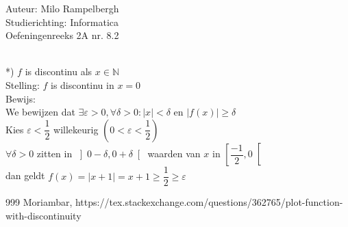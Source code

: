 \documentclass[a4paper]{article}
\newcommand{\E}{\varepsilon}
\begin{document}
\noindent \large Auteur: Milo Rampelbergh \\
\noindent \large Studierichting: Informatica\\
\noindent \large Oefeningenreeks 2A nr. 8.2\\

\medskip

\normalsize


 \\

*) $f$ is discontinu als $ x \in \mathbb{N} $ \\

Stelling: $f$ is discontinu in $ x = 0 $ \\

Bewijs: \\

We bewijzen dat $ \exists \E > 0, \forall \delta > 0: |x| < \delta $ en $ |f(x)| \geq \delta $ \\

Kies $ \E < \dfrac{1}{2} $ willekeurig $ (0 < \E < \dfrac{1}{2}) $ \\

$ \forall \delta > 0 $ zitten in $     \left] 0-\delta, 0+\delta \right[    $ waarden van $x$ in $       \left[\dfrac{-1}{2}, 0 \right[      $ \\

dan geldt $ f(x) = |x+1| = x+1 \geq \dfrac{1}{2} \geq \E $ \\


\begin{thebibliography}{999}
 Moriambar, https://tex.stackexchange.com/questions/362765/plot-function-with-discontinuity
\end{thebibliography}
\end{document}
